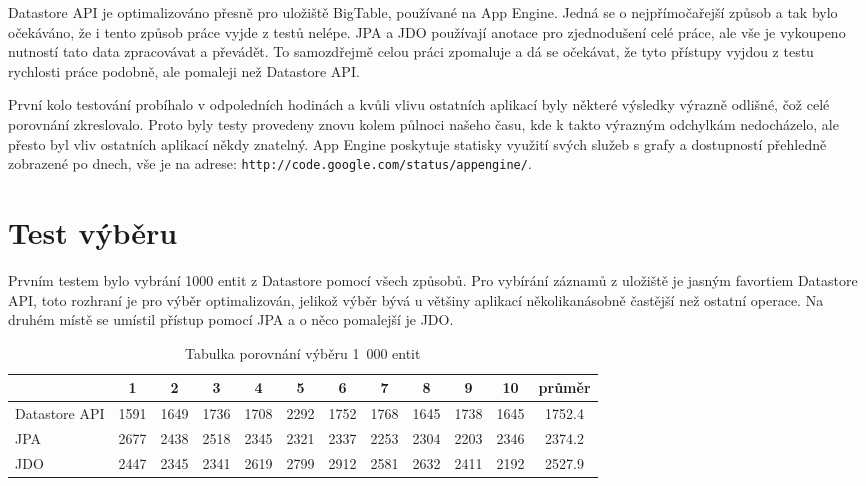 Datastore API je optimalizováno přesně pro uložiště BigTable, používané na App Engine. Jedná se o nejpřímočařejší způsob a tak bylo očekáváno, že i tento způsob práce vyjde z testů nelépe. JPA a JDO používají anotace pro zjednodušení celé práce, ale vše je vykoupeno nutností tato data zpracovávat a převádět. To samozdřejmě celou práci zpomaluje a dá se očekávat, že tyto přístupy vyjdou z testu rychlosti práce podobně, ale pomaleji než Datastore API.

První kolo testování probíhalo v odpoledních hodinách a kvůli vlivu ostatních aplikací byly některé výsledky výrazně odlišné, čož celé porovnání zkreslovalo. Proto byly testy provedeny znovu kolem půlnoci našeho času, kde k takto výrazným odchylkám nedocházelo, ale přesto byl vliv ostatních aplikací někdy znatelný. App Engine poskytuje statisky využití svých služeb s grafy a dostupností přehledně zobrazené po dnech, vše je na  adrese: \verb|http://code.google.com/status/appengine/|.

\section{Test výběru}
Prvním testem bylo vybrání 1000 entit z Datastore pomocí všech způsobů. Pro vybírání záznamů z uložiště je jasným favortiem Datastore API, toto rozhraní je pro výběr optimalizován, jelikož výběr bývá u většiny aplikací několikanásobně častější než ostatní operace. Na druhém místě se umístil přístup pomocí JPA a o něco pomalejší je JDO.

\begin{table}[h]
\centering
\caption{Tabulka porovnání výběru 1~000 entit }\label{tab:select}
\begin{tabular}{|l|c|c|c|c|c|c|c|c|c|c|c|}
   \hline
	& 1		& 2		& 3		& 4		& 5		& 6		& 7		& 8		& 9		& 10		& průměr \\
   \hline
Datastore API	& 1591	& 1649	& 1736	& 1708	& 2292	& 1752	& 1768	& 1645	& 1738	& 1645	& 1752.4 \\
JPA	& 2677	& 2438	& 2518	& 2345	& 2321	& 2337	& 2253	& 2304	& 2203	& 2346	& 2374.2 \\
JDO	& 2447	& 2345	& 2341	& 2619	& 2799	& 2912	& 2581	& 2632	& 2411	& 2192	& 2527.9 \\
   \hline
\end{tabular}
\end{table}

